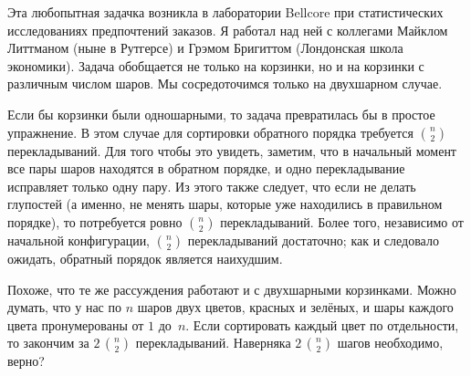 \documentclass[twoside]{book}
\begin{document}
Эта любопытная задачка возникла в лаборатории Bellcore  при статистических исследованиях предпочтений заказов.
Я работал над ней с коллегами Майклом Литтманом (ныне в Рутгерсе) и Грэмом Бригиттом (Лондонская школа экономики).
Задача обобщается не только на  корзинки, но и на корзинки с различным числом шаров.
Мы сосредоточимся только на двухшарном случае.

\medskip

Если бы корзинки были одношарными, то задача превратилась бы в простое упражнение.
В этом случае для сортировки обратного порядка требуется $\binom{n}{2}$ перекладываний.
Для того чтобы это увидеть, заметим, что в начальный момент все пары шаров находятся в обратном порядке, и одно перекладывание исправляет только одну пару.
Из этого также следует, что если не делать глупостей (а именно, не менять шары, которые уже находились в правильном порядке), то потребуется ровно $\binom{n}{2}$ перекладываний.
Более того, независимо от начальной конфигурации, $\binom{n}{2}$ перекладываний достаточно; как и следовало ожидать, обратный порядок является наихудшим.

\medskip

Похоже, что те же рассуждения работают и с двухшарными корзинками.
Можно думать, что у нас по $n$ шаров двух цветов, красных и зелёных, и шары каждого цвета пронумерованы от $1$ до~$n$.
Если сортировать каждый цвет по отдельности, то закончим за $2\,\binom{n}{2}$ перекладываний.
Наверняка $2\,\binom{n}{2}$ шагов необходимо, верно?
\end{document}
